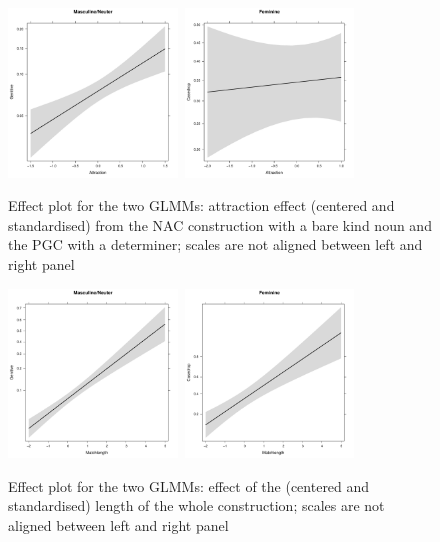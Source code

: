 \documentclass[USenglish]{article}
\begin{document}
\begin{figure}[h]
\centering
\includegraphics[width=0.4\textwidth]{figures/corpus/04_glmm_fixeff_mn_Attraction}~\includegraphics[width=0.4\textwidth]{figures/corpus/04_glmm_fixeff_fem_Attraction}
\caption{Effect plot for the two GLMMs: attraction effect (centered and standardised) from the NAC construction with a bare kind noun and the PGC with a determiner; scales are not aligned between left and right panel}
\label{fig:glmm:fixef:attraction}
\end{figure}

\begin{figure}[h]
\centering
\includegraphics[width=0.4\textwidth]{figures/corpus/04_glmm_fixeff_mn_Matchlength}~\includegraphics[width=0.4\textwidth]{figures/corpus/04_glmm_fixeff_fem_Matchlength}
\caption{Effect plot for the two GLMMs: effect of the (centered and standardised) length of the whole construction; scales are not aligned between left and right panel}
\label{fig:glmm:fixef:matchlength}
\end{figure}
\end{document}
